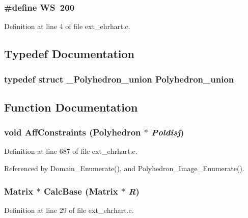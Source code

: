 \subsubsection{\setlength{\rightskip}{0pt plus 5cm}\#define WS\ 200}\label{ext__ehrhart_8c_a0}




Definition at line 4 of file ext\_\-ehrhart.c.

\subsection{Typedef Documentation}
\subsubsection{\setlength{\rightskip}{0pt plus 5cm}typedef struct {\bf \_\-Polyhedron\_\-union}  Polyhedron\_\-union}\label{ext__ehrhart_8c_a1}




\subsection{Function Documentation}
\subsubsection{\setlength{\rightskip}{0pt plus 5cm}void Aff\-Constraints (Polyhedron $\ast$ {\em Poldisj})}\label{ext__ehrhart_8c_a17}




Definition at line 687 of file ext\_\-ehrhart.c.

Referenced by Domain\_\-Enumerate(), and Polyhedron\_\-Image\_\-Enumerate().

\subsubsection{\setlength{\rightskip}{0pt plus 5cm}Matrix $\ast$ Calc\-Base (Matrix $\ast$ {\em R})}\label{ext__ehrhart_8c_a3}




Definition at line 29 of file ext\_\-ehrhart.c.

